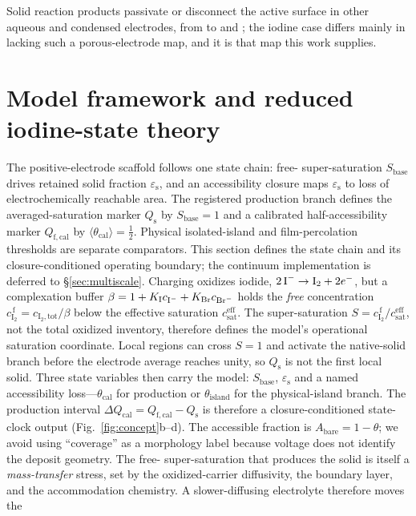 \documentclass[11pt]{article}
\newcommand{\cf}{c_{\mathrm{I_2}}^{\,\mathrm{f}}}
\newcommand{\csat}{c_{\mathrm{sat}}}
\newcommand{\epss}{\varepsilon_{\mathrm{s}}}
\newcommand{\thetacal}{\theta_{\mathrm{cal}}}
\newcommand{\thetaisland}{\theta_{\mathrm{island}}}
\newcommand{\Qfcal}{Q_{\mathrm{f,cal}}}
\begin{document}
Solid reaction products passivate or disconnect the active surface in other aqueous and
condensed electrodes, from  to  and  \citep{ZnO_EEM2024,Li2S_EcoMat2024,YangZnMn2026};
the iodine case differs mainly in lacking such a porous-electrode map, and it is that map this work supplies.

\section{Model framework and reduced iodine-state theory}
\label{sec:theory}
The positive-electrode scaffold follows one state chain: free- super-saturation
$S_{\mathrm{base}}$ drives retained solid fraction $\epss$, and an accessibility closure maps $\epss$ to
loss of electrochemically reachable area. The registered production branch defines the averaged-saturation
marker $Q_{\mathrm s}$ by $S_{\mathrm{base}}=1$ and a calibrated half-accessibility marker $\Qfcal$ by
$\langle\thetacal\rangle=\tfrac12$. Physical isolated-island and film-percolation thresholds are separate
comparators. This section defines the state chain and its closure-conditioned operating boundary; the continuum
implementation is deferred to \S\ref{sec:multiscale}. Charging oxidizes iodide,
$2\,\ce{I^-}\rightarrow\ce{I2}+2e^-$, but a complexation buffer
$\beta = 1 + K_{\mathrm I}c_{\ce{I^-}} + K_{\mathrm{Br}}c_{\ce{Br^-}}$ holds the \emph{free} 
concentration $\cf = c_{\mathrm{I_2,tot}}/\beta$ below the effective saturation $\csat^{\mathrm{eff}}$. The super-saturation
$S=\cf/\csat^{\mathrm{eff}}$, not the total oxidized inventory, therefore defines the model's operational
saturation coordinate. Local regions can cross $S=1$ and activate the native-solid branch before the
electrode average reaches unity, so $Q_{\mathrm s}$ is not the first local solid. Three state variables then carry
the model: $S_{\mathrm{base}}$, $\epss$ and a named accessibility loss---$\thetacal$ for production or
$\thetaisland$ for the physical-island branch. The production interval
$\Delta Q_{\mathrm{cal}}=\Qfcal-Q_{\mathrm s}$ is therefore a closure-conditioned state-clock output
(Fig.~\ref{fig:concept}b--d). The accessible fraction is $A_{\mathrm{bare}}=1-\theta$; we avoid using
``coverage'' as a morphology label because voltage does not identify the deposit geometry.
The free- super-saturation
that produces the solid is itself a \emph{mass-transfer} stress, set by the oxidized-carrier diffusivity, the
boundary layer, and the accommodation chemistry. A slower-diffusing electrolyte therefore moves the
\end{document}
